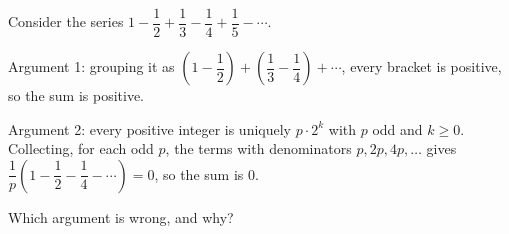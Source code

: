 Consider the series $1-\dfrac{1}{2}+\dfrac{1}{3}-\dfrac{1}{4}+\dfrac{1}{5}-\cdots$.

Argument 1: grouping it as $\left(1-\dfrac{1}{2}\right)+\left(\dfrac{1}{3}-\dfrac{1}{4}\right)+\cdots$, every bracket is positive, so the sum is positive.

Argument 2: every positive integer is uniquely $p\cdot2^k$ with $p$ odd and $k\ge0$. Collecting, for each odd $p$, the terms with denominators $p,2p,4p,\dots$ gives $\dfrac{1}{p}\left(1-\dfrac{1}{2}-\dfrac{1}{4}-\cdots\right)=0$, so the sum is $0$.

Which argument is wrong, and why?
